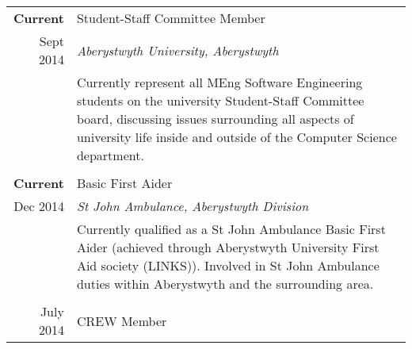 \documentclass[a4paper, 10pt]{extarticle} %
\begin{document}
\begin{tabular}{r | p{13cm}}	

\textbf{Current}
		
		 & 
		 
		 Student-Staff Committee Member  \\
		 
			Sept 2014
		 
		& 
		 
		\textit{Aberystwyth University, Aberystwyth} \\ 
		
& 

\footnotesize{

Currently represent all MEng Software Engineering students on the university Student-Staff Committee board, discussing issues surrounding all aspects of university life inside and outside of the Computer Science department. 

\vspace{-0.4cm}

} \vspace{-0.4cm} \\

\multicolumn{2}{c}{} \\

\textbf{Current}
		
		 & 
		 
		 Basic First Aider  \\
		 
			Dec 2014
		 
		& 
		 
		\textit{St John Ambulance, Aberystwyth Division} \\ 
		
& 

\footnotesize{

Currently qualified as a St John Ambulance Basic First Aider (achieved through Aberystwyth University First Aid society (LINKS)). Involved in St John Ambulance duties within Aberystwyth and the surrounding area. 

\vspace{-0.4cm}

} \vspace{-0.4cm} \\

\multicolumn{2}{c}{} \\

July 2014 

		&
		 
		 CREW Member  \\
		 

\end{tabular}
\end{document}
